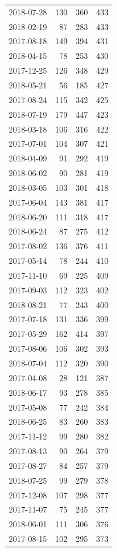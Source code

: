 \begin{tabular}{lrrr}
2018-07-28 & 130 & 360 & 433 \\
2018-02-19 & 87 & 283 & 433 \\
2017-08-18 & 149 & 394 & 431 \\
2018-04-15 & 78 & 253 & 430 \\
2017-12-25 & 126 & 348 & 429 \\
2018-05-21 & 56 & 185 & 427 \\
2017-08-24 & 115 & 342 & 425 \\
2018-07-19 & 179 & 447 & 423 \\
2018-03-18 & 106 & 316 & 422 \\
2017-07-01 & 104 & 307 & 421 \\
2018-04-09 & 91 & 292 & 419 \\
2018-06-02 & 90 & 281 & 419 \\
2018-03-05 & 103 & 301 & 418 \\
2017-06-04 & 143 & 381 & 417 \\
2018-06-20 & 111 & 318 & 417 \\
2018-06-24 & 87 & 275 & 412 \\
2017-08-02 & 136 & 376 & 411 \\
2017-05-14 & 78 & 244 & 410 \\
2017-11-10 & 69 & 225 & 409 \\
2017-09-03 & 112 & 323 & 402 \\
2018-08-21 & 77 & 243 & 400 \\
2017-07-18 & 131 & 336 & 399 \\
2017-05-29 & 162 & 414 & 397 \\
2017-08-06 & 106 & 302 & 393 \\
2018-07-04 & 112 & 320 & 390 \\
2017-04-08 & 28 & 121 & 387 \\
2018-06-17 & 93 & 278 & 385 \\
2017-05-08 & 77 & 242 & 384 \\
2018-06-25 & 83 & 260 & 383 \\
2017-11-12 & 99 & 280 & 382 \\
2017-08-13 & 90 & 264 & 379 \\
2017-08-27 & 84 & 257 & 379 \\
2018-07-25 & 99 & 279 & 378 \\
2017-12-08 & 107 & 298 & 377 \\
2017-11-07 & 75 & 245 & 377 \\
2018-06-01 & 111 & 306 & 376 \\
2017-08-15 & 102 & 295 & 373 \\

\end{tabular}
